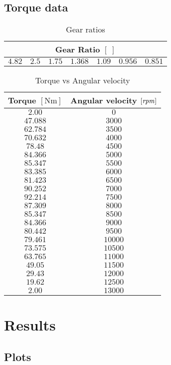 \section{Torque data}
%
%
\begin{table}[h!]
    \centering
    \caption{Gear ratios}
    \label{tab:wheelcoordinates}
    \begin{tabular}{@{}ccccccc@{}}
    \toprule
    \multicolumn{7}{c}{\textbf{Gear Ratio} $[\;]$} \\ \midrule
        $4.82$ & $2.5$ & $1.75$ & $1.368$ & $1.09$ & $0.956$ & $0.851$\\
    \bottomrule
    \end{tabular}
\end{table}
%
%
\begin{table}[h!]
    \centering
    \caption{Torque vs Angular velocity}
    \label{tab:wheelcoordinates}
    \begin{tabular}{@{}cc@{}}
    \toprule
    \multicolumn{1}{c}{\textbf{Torque} $[\si{\newton\metre}]$} & \multicolumn{1}{c}{\textbf{Angular velocity} $[\it rpm]$} \\ \midrule
    $2.00  $  &  $0    $ \\
    $47.088$  &  $3000 $ \\
    $62.784$  &  $3500 $ \\
    $70.632$  &  $4000 $ \\
    $78.48 $  &  $4500 $ \\
    $84.366$  &  $5000 $ \\
    $85.347$  &  $5500 $ \\
    $83.385$  &  $6000 $ \\
    $81.423$  &  $6500 $ \\
    $90.252$  &  $7000 $ \\
    $92.214$  &  $7500 $ \\
    $87.309$  &  $8000 $ \\
    $85.347$  &  $8500 $ \\
    $84.366$  &  $9000 $ \\
    $80.442$  &  $9500 $ \\
    $79.461$  &  $10000$ \\
    $73.575$  &  $10500$ \\
    $63.765$  &  $11000$ \\
    $49.05 $  &  $11500$ \\
    $29.43 $  &  $12000$ \\
    $19.62 $  &  $12500$ \\
    $2.00  $  &  $13000$ \\ 
    \bottomrule
    \end{tabular}
\end{table}
%


%
\chapter{Results}
%
\section{Plots}
%